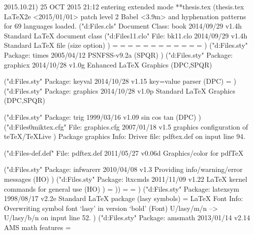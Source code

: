 2015.10.21)  25 OCT 2015 21:12
entering extended mode
**thesis.tex
(thesis.tex
LaTeX2e <2015/01/01> patch level 2
Babel <3.9m> and hyphenation patterns for 69 languages loaded.
("d:\Program Files\tex\latex\base\book.cls"
Document Class: book 2014/09/29 v1.4h Standard LaTeX document class
("d:\Program Files\tex\latex\base\bk11.clo"
File: bk11.clo 2014/09/29 v1.4h Standard LaTeX file (size option)
)
\c@part=
\c@chapter=
\c@section=
\c@subsection=
\c@subsubsection=
\c@paragraph=
\c@subparagraph=
\c@figure=
\c@table=
\abovecaptionskip=
\belowcaptionskip=
\bibindent=
)
("d:\Program Files\tex\latex\psnfss\times.sty"
Package: times 2005/04/12 PSNFSS-v9.2a (SPQR) 
)
("d:\Program Files\tex\latex\graphics\graphicx.sty"
Package: graphicx 2014/10/28 v1.0g Enhanced LaTeX Graphics (DPC,SPQR)

("d:\Program Files\tex\latex\graphics\keyval.sty"
Package: keyval 2014/10/28 v1.15 key=value parser (DPC)
\KV@toks@=
)
("d:\Program Files\tex\latex\graphics\graphics.sty"
Package: graphics 2014/10/28 v1.0p Standard LaTeX Graphics (DPC,SPQR)

("d:\Program Files\tex\latex\graphics\trig.sty"
Package: trig 1999/03/16 v1.09 sin cos tan (DPC)
)
("d:\Program Files\tex\latex\00miktex\graphics.cfg"
File: graphics.cfg 2007/01/18 v1.5 graphics configuration of teTeX/TeXLive
)
Package graphics Info: Driver file: pdftex.def on input line 94.

("d:\Program Files\tex\latex\pdftex-def\pdftex.def"
File: pdftex.def 2011/05/27 v0.06d Graphics/color for pdfTeX

("d:\Program Files\tex\generic\oberdiek\infwarerr.sty"
Package: infwarerr 2010/04/08 v1.3 Providing info/warning/error messages (HO)
)
("d:\Program Files\tex\generic\oberdiek\ltxcmds.sty"
Package: ltxcmds 2011/11/09 v1.22 LaTeX kernel commands for general use (HO)
)
\Gread@gobject=
))
\Gin@req@height=
\Gin@req@width=
)
("d:\Program Files\tex\latex\base\latexsym.sty"
Package: latexsym 1998/08/17 v2.2e Standard LaTeX package (lasy symbols)
\symlasy=
LaTeX Font Info:    Overwriting symbol font `lasy' in version `bold'
(Font)                  U/lasy/m/n --> U/lasy/b/n on input line 52.
)
("d:\Program Files\tex\latex\amsmath\amsmath.sty"
Package: amsmath 2013/01/14 v2.14 AMS math features
\@mathmargin=

